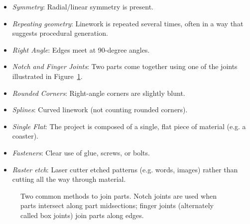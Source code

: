 \documentclass{article}
\begin{document}
\begin{itemize}
\item \textit{Symmetry}: Radial/linear symmetry is present.
\item \textit{Repeating geometry}: Linework is repeated several times,
  often in a way that suggests procedural generation.
\item \textit{Right Angle}: Edges meet at 90-degree angles.
\item \textit{Notch and Finger Joints}: Two parts come together using one of
  the joints illustrated in Figure~\ref{fig:joint}.
\item \textit{Rounded Corners}: Right-angle corners are slightly blunt.
\item \textit{Splines}: Curved linework (not counting rounded corners).
\item \textit{Single Flat}: The project is composed of a single, flat
  piece of material (e.g. a coaster).
\item \textit{Fasteners}: Clear use of glue, screws, or bolts.
\item \textit{Raster etch}: Laser cutter etched patterns (e.g. words,
  images) rather than cutting all the way through material.
\end{itemize}

\begin{figure}[h]
\centering 
{}
\caption{Two common methods to join parts. Notch joints are used when
  parts intersect along part midsections; finger joints (alternately
  called box joints) join parts along edges.}
\label{fig:joint}
\end{figure}
\end{document}
